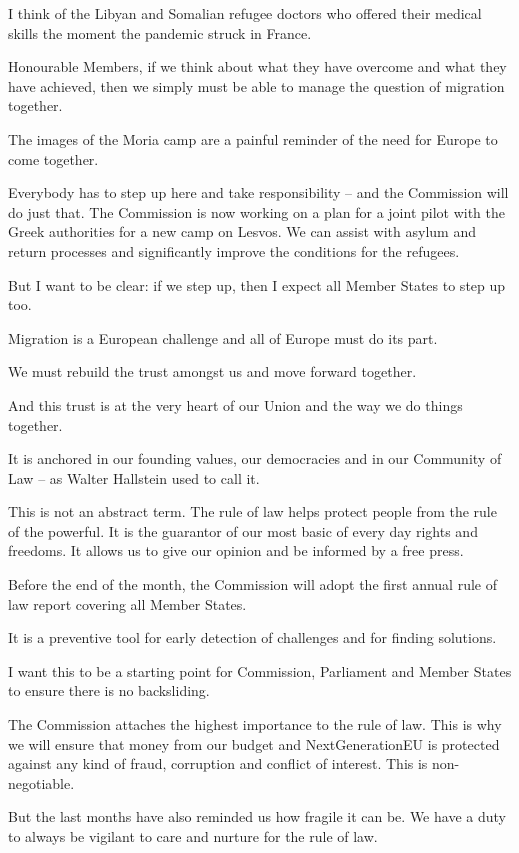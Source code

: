 \documentclass[a4paper,11pt]{article}
\begin{document}
I think of the Libyan and Somalian refugee doctors who offered their medical skills the moment the pandemic struck in France.

Honourable Members, if we think about what they have overcome and what they have achieved, then we simply must be able to manage the question of migration together.

The images of the Moria camp are a painful reminder of the need for Europe to come together.

Everybody has to step up here and take responsibility – and the Commission will do just that. The Commission is now working on a plan for a joint pilot with the Greek authorities for a new camp on Lesvos. We can assist with asylum and return processes and significantly improve the conditions for the refugees.

But I want to be clear: if we step up, then I expect all Member States to step up too.

Migration is a European challenge and all of Europe must do its part.

We must rebuild the trust amongst us and move forward together.

And this trust is at the very heart of our Union and the way we do things together.

It is anchored in our founding values, our democracies and in our Community of Law – as Walter Hallstein used to call it.

This is not an abstract term. The rule of law helps protect people from the rule of the powerful. It is the guarantor of our most basic of every day rights and freedoms. It allows us to give our opinion and be informed by a free press.

Before the end of the month, the Commission will adopt the first annual rule of law report covering all Member States.

It is a preventive tool for early detection of challenges and for finding solutions.

I want this to be a starting point for Commission, Parliament and Member States to ensure there is no backsliding.

The Commission attaches the highest importance to the rule of law. This is why we will ensure that money from our budget and NextGenerationEU is protected against any kind of fraud, corruption and conflict of interest. This is non-negotiable.

But the last months have also reminded us how fragile it can be. We have a duty to always be vigilant to care and nurture for the rule of law.
\end{document}
